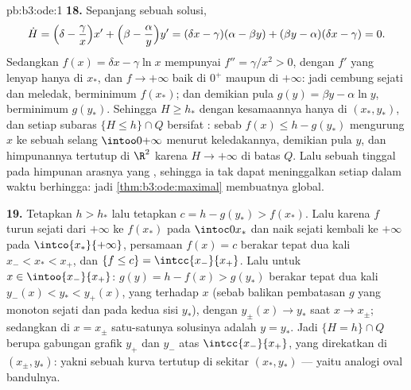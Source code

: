 \begin{solution}{pb:b3:ode:1}
\textbf{18.} Sepanjang sebuah solusi,
\[
\dot H = \Bigl(\delta - \frac\gamma x\Bigr)x' +
\Bigl(\beta - \frac\alpha y\Bigr)y'
= (\delta x - \gamma)(\alpha - \beta y) +
(\beta y - \alpha)(\delta x - \gamma) = 0 .
\]
Sedangkan $f(x) = \delta x - \gamma\ln x$ mempunyai $f'' = \gamma/x^2 > 0$,
dengan $f'$ yang lenyap hanya di $x_*$, dan $f \to +\infty$ baik di
$0^+$ maupun di $+\infty$: jadi cembung sejati dan meledak, berminimum
$f(x_*)$; dan demikian pula $g(y) = \beta y - \alpha\ln y$, berminimum
$g(y_*)$. Sehingga $H \geq h_*$ dengan kesamaannya hanya di $(x_*,
y_*)$, dan setiap subaras $\{H \leq h\}\cap Q$ bersifat :
sebab $f(x) \leq h - g(y_*)$ mengurung $x$ ke sebuah selang 
$\intoo0{+\infty}$ menurut keledakannya, demikian pula $y$, dan himpunannya
tertutup di $\R^2$ karena $H \to +\infty$ di batas
$Q$. Lalu sebuah  tinggal pada himpunan arasnya yang , sehingga
ia tak dapat meninggalkan setiap  dalam waktu berhingga:
jadi \cref{thm:b3:ode:maximal} membuatnya global.

\textbf{19.} Tetapkan $h > h_*$ lalu tetapkan $c = h - g(y_*) >
f(x_*)$. Lalu karena $f$ turun sejati dari $+\infty$ ke
$f(x_*)$ pada $\intoc0{x_*}$ dan naik sejati kembali ke
$+\infty$ pada $\intco{x_*}{+\infty}$, persamaan $f(x) = c$
berakar tepat dua kali $x_- < x_* < x_+$, dan $\{f \leq c\} =
\intcc{x_-}{x_+}$. Lalu untuk $x \in \intoo{x_-}{x_+}$: $g(y) = h -
f(x) > g(y_*)$ berakar tepat dua kali $y_-(x) < y_* <
y_+(x)$, yang  terhadap $x$ (sebab balikan pembatasan $g$ yang
monoton sejati dan  pada kedua sisi
$y_*$), dengan $y_\pm(x) \to y_*$ saat $x \to x_\pm$; sedangkan di $x =
x_\pm$ satu-satunya solusinya adalah $y = y_*$. Jadi $\{H = h\}\cap
Q$ berupa gabungan grafik $y_+$ dan $y_-$ atas
$\intcc{x_-}{x_+}$, yang direkatkan di $(x_\pm, y_*)$: yakni sebuah kurva tertutup
di sekitar $(x_*, y_*)$ --- yaitu analogi oval
bandulnya.


\end{solution}
